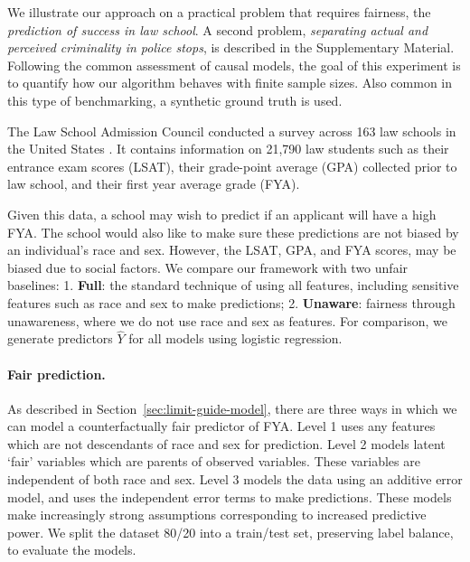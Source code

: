 We illustrate our approach on a practical problem that requires
fairness, the \emph{prediction of success in law school}. A second
problem, \emph{separating actual and perceived criminality in police
  stops}, is described in the Supplementary Material. Following the
common assessment of causal models, the goal of this experiment is to
quantify how our algorithm behaves with finite sample sizes. Also common
in this type of benchmarking, a synthetic ground truth is used.


The Law School Admission Council
conducted a survey across 163 law
schools in the United States \cite{wightman1998lsac}. %
It contains information on 21,790 law students such as their entrance
exam scores (LSAT), their grade-point average (GPA) collected prior to
law school, and their first year average grade (FYA).

Given this data, a school may wish to predict if an applicant will
have a high FYA.
The school would also like to make sure these
predictions are not biased by an individual's race and sex. However,
the LSAT, GPA, and FYA scores, may be biased due to social factors. %
We compare our framework with two unfair baselines: 1. \textbf{Full}:
the standard technique of using all features, including sensitive
features such as race and sex to make predictions;
2. \textbf{Unaware}: fairness through unawareness, where we do not use
race and sex as features. For comparison, we generate predictors $\hat
Y$ for all models using logistic regression.


\paragraph{Fair prediction.}
As described in Section~\ref{sec:limit-guide-model}, there are three
ways in which we can model a counterfactually fair predictor of
FYA. Level 1 uses any features which are not descendants of race and
sex for prediction. Level 2 models latent `fair' variables which are
parents of observed variables. These variables are independent of both
race and sex. Level 3 models the data using an additive error model,
and uses the independent error terms to make predictions. These models
make increasingly strong assumptions corresponding to increased
predictive power. We split the dataset 80/20 into a train/test set,
preserving label balance, to evaluate the models.

